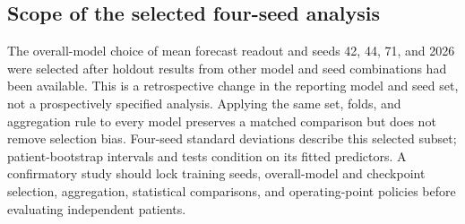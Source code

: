 \subsection{Scope of the selected four-seed analysis}
The overall-model choice of mean forecast readout and seeds 42, 44, 71, and 2026 were selected after holdout results from other model and seed combinations had been available. This is a retrospective change in the reporting model and seed set, not a prospectively specified analysis. Applying the same set, folds, and aggregation rule to every model preserves a matched comparison but does not remove selection bias. Four-seed standard deviations describe this selected subset; patient-bootstrap intervals and tests condition on its fitted predictors. A confirmatory study should lock training seeds, overall-model and checkpoint selection, aggregation, statistical comparisons, and operating-point policies before evaluating independent patients.
